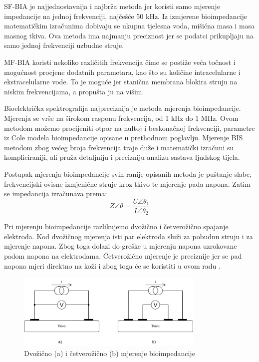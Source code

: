 \documentclass[../diplomski_rad.tex]{subfiles}
\begin{document}
SF-BIA je najjednostavnija i najbrža metoda jer koristi samo mjerenje impedancije na jednoj frekvenciji, najčešće 50 kHz. 
Iz izmjerene bioimpedancije matematičkim izračunima dobivaju se ukupna tjelesna voda, mišićna masa i masa masnog tkiva. 
Ova metoda ima najmanju preciznost jer se podatci prikupljaju na samo jednoj frekvenciji uzbudne struje.

MF-BIA koristi nekoliko različitih frekvencija čime se postiže veća točnost i mogućnost procjene dodatnih parametara, 
kao što su količine intracelularne i ekstracelularne vode. To je moguće jer stanična membrana blokira struju na niskim frekvencijama, 
a propušta ju na višim. 

Bioelektrička spektrografija najpreciznija je metoda mjerenja bioimpedancije. 
Mjerenja se vrše na širokom rasponu frekvencija, od 1 kHz do 1 MHz.  
Ovom metodom možemo procijeniti otpor na nultoj i beskonačnoj frekvenciji, parametre iz Cole modela bioimpedancije 
opisane u prethodnom poglavlju. 
Mjerenje BIS metodom zbog većeg broja frekvencija traje duže i matematički izračuni su kompliciraniji, 
ali pruža  detaljniju i precizniju analizu sastava ljudskog tijela.

Postupak mjerenja bioimpedancije svih ranije opisanih metoda je puštanje slabe, 
frekvencijski ovisne izmjenične struje kroz tkivo te mjerenje pada napona. 
Zatim se impedancija izračunava prema:
\begin{equation}
    \label{jed:prvajednadzba}
    Z\angle\theta = \frac{U\angle\theta_{1}}{I\angle\theta_{2}} 
\end{equation} 

Pri mjerenju bioimpedancije razlikujemo dvožično i četverožično spajanje elektroda. 
Kod dvožičnog mjerenja isti par elektroda služi za pobudnu struju i za mjerenje napona. 
Zbog toga dolazi do greške u mjerenju napona uzrokovane padom napona na elektrodama. 
Četverožično mjerenje je preciznije jer se pad napona mjeri direktno na koži i zbog toga će se koristiti u ovom radu \cite{Abasi2022}. 

\begin{figure}[htb]
    \centering
    \includegraphics[width=0.8\textwidth]{Figures/dvo_vs_cetverozicno.png} 
    \caption{Dvožično (a) i četverožično (b) mjerenje bioimpedancije}
    \label{slk:cole_model}
\end{figure}
\end{document}
